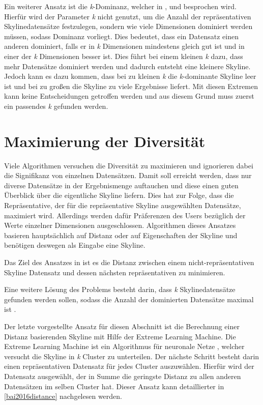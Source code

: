 Ein weiterer Ansatz ist die \textit{k}-Dominanz, welcher in \cite{Chan:2006:FKS:1142473.1142530}, \cite{Chan:2006:HDS:2117976.2118017} und \cite{5480364} besprochen wird. Hierfür wird der Parameter \textit{k} nicht genutzt, um die Anzahl der repräsentativen Skylinedatensätze festzulegen, sondern wie viele Dimensionen dominiert werden müssen, sodass Dominanz vorliegt. Dies bedeutet, dass ein Datensatz einen anderen dominiert, falls er  in \textit{k} Dimensionen mindestens gleich gut ist und in einer der \textit{k} Dimensionen besser ist. Dies führt bei einem kleinen \textit{k} dazu, dass mehr Datensätze dominiert werden und dadurch entsteht eine kleinere Skyline. Jedoch kann es dazu kommen, dass bei zu kleinen \textit{k} die \textit{k}-dominante Skyline leer ist und bei zu großen die Skyline zu viele Ergebnisse liefert. Mit diesen Extremen kann keine Entscheidungen getroffen werden und aus diesem Grund muss zuerst ein passendes \textit{k} gefunden werden.
\section{Maximierung der Diversität}
\label{ch:Forschungsstand:sec:maxDiv}
Viele Algorithmen versuchen die Diversität zu maximieren und ignorieren dabei die Signifikanz von einzelnen Datensätzen. Damit soll erreicht werden, dass nur diverse Datensätze in der Ergebnismenge auftauchen und diese einen guten Überblick über die eigentliche Skyline liefern.
Dies hat zur Folge, dass die Repräsentative, der für die repräsentative Skyline ausgewählten Datensätze, maximiert wird. Allerdings werden dafür Präferenzen des Users bezüglich der Werte einzelner Dimensionen ausgeschlossen. Algorithmen dieses Ansatzes basieren hauptsächlich auf Distanz oder auf Eigenschaften der Skyline und benötigen deswegen als Eingabe eine Skyline. 

Das Ziel des Ansatzes in \cite{Tao:2009:DRS:1546683.1547325} ist es die Distanz zwischen einem nicht-repräsentativen Skyline Datensatz und dessen nächsten repräsentativen zu minimieren. 

Eine weitere Lösung des Problems besteht darin, dass \textit{k} Skylinedatensätze gefunden werden sollen, sodass die Anzahl der dominierten Datensätze maximal ist \cite{4221657}.

Der letzte vorgestellte Ansatz für diesen Abschnitt ist die Berechnung einer Distanz basierenden Skyline mit Hilfe der Extreme Learning Machine. Die Extreme Learning Machine ist ein Algorithmus für neuronale Netze \cite{huang2006extreme}, welcher versucht die Skyline in \textit{k} Cluster zu unterteilen. Der nächste Schritt besteht darin einen repräsentativen Datensatz für jedes Cluster auszuwählen. Hierfür wird der Datensatz ausgewählt, der in Summe die geringste Distanz zu allen anderen Datensätzen im selben Cluster hat. Dieser Ansatz kann detaillierter in \ref{bai2016distance} nachgelesen werden.
